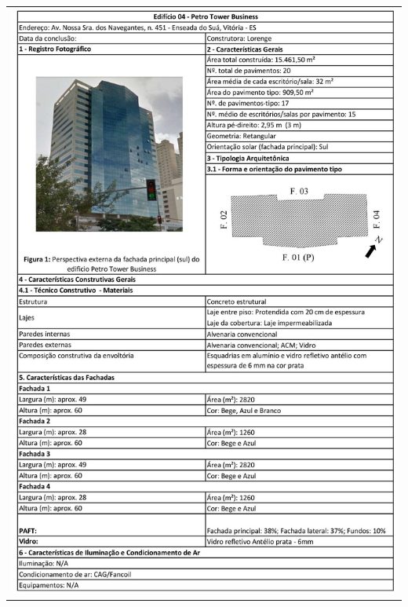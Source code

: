 \begin{table}[H]
    \centering
    \begin{tabular}{l}
        \includegraphics[width=\textwidth]{figures/appendices/edificio04.jpg}
    \end{tabular}
\end{table}
\pagebreak
